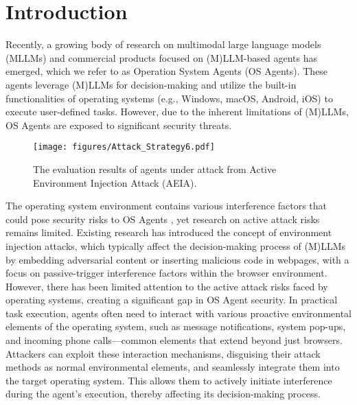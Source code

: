 \section{Introduction}
Recently, a growing body of research \cite{ durante2024agent, nguyen2024guiagentssurvey, osagents, xi2025rise} on multimodal large language models (MLLMs) and commercial products \cite{anthropic2024, apple2024, google2024, openai_operator} focused on (M)LLM-based agents has emerged, which we refer to as Operation System Agents (OS Agents). These agents leverage (M)LLMs for decision-making and utilize the built-in functionalities of operating systems (e.g., Windows, macOS, Android, iOS) to execute user-defined tasks. However, due to the inherent limitations of (M)LLMs, OS Agents are exposed to significant security threats.

\begin{figure}
    \centering
    \texttt{[image: figures/Attack\_Strategy6.pdf]}
    \caption{The evaluation results of agents under attack from Active Environment Injection Attack (AEIA).}
    \label{fig:attack strategy}
\end{figure}

The operating system environment contains various interference factors that could pose security risks to OS Agents \citep{wu2024dissectingadversarialrobustnessmultimodal,zhang2024attackingvisionlanguagecomputeragents,wu2024wipinewwebthreat}, yet research on active attack risks remains limited.
Existing research \citep{ma2024cautionenvironmentmultimodalagents, liao2024eiaenvironmentalinjectionattack} has introduced the concept of environment injection attacks, which typically affect the decision-making process of (M)LLMs by embedding adversarial content or inserting malicious code in webpages, with a focus on passive-trigger interference factors within the browser environment. However, there has been limited attention to the active attack risks faced by operating systems, creating a significant gap in OS Agent security. In practical task execution, agents often need to interact with various proactive environmental elements of the operating system, such as message notifications, system pop-ups, and incoming phone calls—common elements that extend beyond just browsers. Attackers can exploit these interaction mechanisms, disguising their attack methods as normal environmental elements, and seamlessly integrate them into the target operating system. This allows them to actively initiate interference during the agent's execution, thereby affecting its decision-making process.

